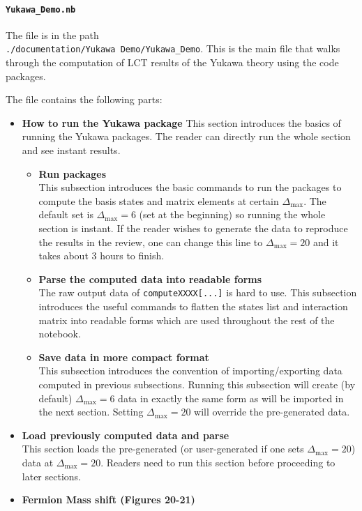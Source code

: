 \documentclass[12pt]{article}
\newcommand\De\Delta
\newcommand{\Dmax}{\De_{\max}}
\begin{document}
\paragraph{{\tt Yukawa\_Demo.nb}}
The file is in the path \\{\tt ./documentation/Yukawa Demo/Yukawa\_Demo}. This is the main file that walks through the computation of LCT results of the Yukawa theory using the code packages. 

The file contains the following parts:
\begin{itemize}
\item \textbf{How to run the Yukawa package} \newline
This section introduces the basics of running the Yukawa packages. The reader can directly run the whole section and see instant results.
  \begin{itemize}
  \item \textbf{Run packages}\\
  This subsection introduces the basic commands to run the packages to compute the basis states and matrix elements at certain $\Dmax$. The default set is $\Dmax=6$ (set at the beginning) so running the whole section is instant. If the reader wishes to generate the data to reproduce the results in the review, one can change this line to $\Dmax=20$ and it takes about 3 hours to finish.
  \item \textbf{Parse the computed data into readable forms}\\
  The raw output data of {\tt computeXXXX[...]} is hard to use. This subsection introduces the useful commands to flatten the states list and interaction matrix into readable forms which are used throughout the rest of the notebook.
  \item \textbf{Save data in more compact format}\\
  This subsection introduces the convention of importing/exporting data computed in previous subsections. Running this subsection will create (by default) $\Dmax=6$ data in exactly the same form as will be imported in the next section. Setting $\Dmax=20$ will override the pre-generated data.
  \end{itemize}
\item \textbf{Load previously computed data and parse}\\
This section loads the pre-generated (or user-generated if one sets $\Dmax=20$) data at $\Dmax=20$. Readers need to run this section before proceeding to later sections.
\item \textbf{Fermion Mass shift (Figures 20-21)}\\

\end{itemize}
\end{document}
